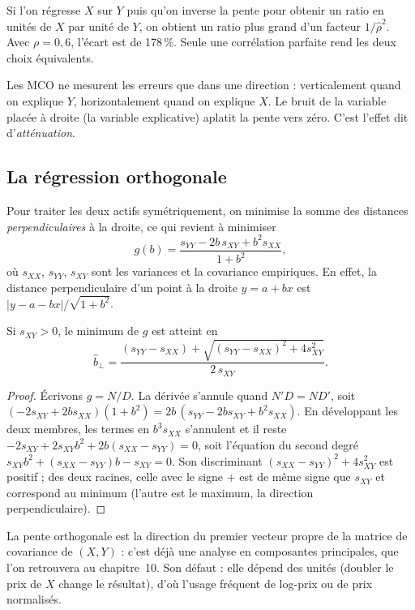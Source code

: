 Si l'on régresse $X$ sur $Y$ puis qu'on inverse la pente pour obtenir un ratio \og en unités de $X$ par unité de $Y$\fg, on obtient un ratio plus grand d'un facteur $1/\hat\rho^2$. Avec $\rho = 0{,}6$, l'écart est de 178\,\%. Seule une corrélation parfaite rend les deux choix équivalents.

\begin{intuition}
Les MCO ne mesurent les erreurs que dans une direction : verticalement quand on explique $Y$, horizontalement quand on explique $X$. Le bruit de la variable placée à droite (la variable explicative) \og aplatit\fg{} la pente vers zéro. C'est l'effet dit d'\emph{atténuation}.
\end{intuition}

\subsection{La régression orthogonale}

Pour traiter les deux actifs symétriquement, on minimise la somme des distances \emph{perpendiculaires} à la droite, ce qui revient à minimiser
\[
g(b) = \frac{s_{YY} - 2b\,s_{XY} + b^2 s_{XX}}{1+b^2},
\]
où $s_{XX}$, $s_{YY}$, $s_{XY}$ sont les variances et la covariance empiriques. En effet, la distance perpendiculaire d'un point à la droite $y = a + bx$ est $|y - a - bx|/\sqrt{1+b^2}$.

\begin{proposition}\label{c2:prop:tls}
Si $s_{XY} > 0$, le minimum de $g$ est atteint en
\[
\hat b_{\perp} = \frac{(s_{YY}-s_{XX}) + \sqrt{(s_{YY}-s_{XX})^2 + 4s_{XY}^2}}{2\,s_{XY}}.
\]
\end{proposition}
\begin{proof}
Écrivons $g = N/D$. La dérivée s'annule quand $N'D = ND'$, soit
$(-2s_{XY} + 2bs_{XX})(1+b^2) = 2b\,(s_{YY} - 2bs_{XY} + b^2s_{XX})$.
En développant les deux membres, les termes en $b^3s_{XX}$ s'annulent et il reste
$-2s_{XY} + 2s_{XY}b^2 + 2b(s_{XX} - s_{YY}) = 0$, soit l'équation du second degré $s_{XY}b^2 + (s_{XX}-s_{YY})b - s_{XY} = 0$. Son discriminant $(s_{XX}-s_{YY})^2 + 4s_{XY}^2$ est positif ; des deux racines, celle avec le signe $+$ est de même signe que $s_{XY}$ et correspond au minimum (l'autre est le maximum, la direction perpendiculaire).
\end{proof}

La pente orthogonale est la direction du premier vecteur propre de la matrice de covariance de $(X,Y)$ : c'est déjà une analyse en composantes principales, que l'on retrouvera au chapitre~10. Son défaut : elle dépend des unités (doubler le prix de $X$ change le résultat), d'où l'usage fréquent de log-prix ou de prix normalisés.

